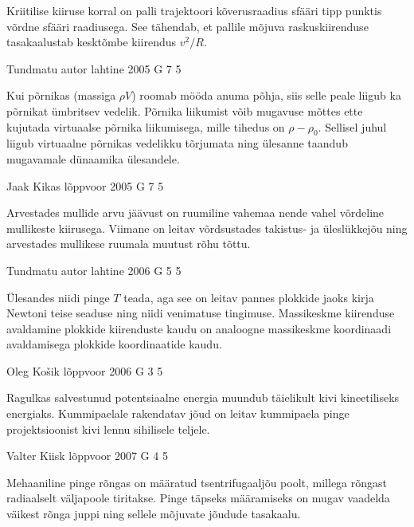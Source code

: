 \documentclass[11pt]{article}
\begin{document}
{{\ifHint
Kriitilise kiiruse korral on palli trajektoori kõverusraadius sfääri tipp punktis võrdne sfääri raadiusega. See tähendab, et pallile mõjuva raskuskiirenduse tasakaalustab kesktõmbe kiirendus $v^2/R$.
\fi
}

{Tundmatu autor} %
{lahtine} %
{2005} %
{G 7} %
{5} %
{

\ifHint
Kui põrnikas (massiga $\rho V$) roomab mööda anuma põhja, siis selle peale liigub ka põrnikat ümbritsev vedelik. Põrnika liikumist võib mugavuse mõttes ette kujutada virtuaalse põrnika liikumisega, mille tihedus on $\rho - \rho_0$. Sellisel juhul liigub virtuaalne põrnikas vedelikku tõrjumata ning ülesanne taandub mugavamale dünaamika ülesandele.
\fi
}

{Jaak Kikas} %
{lõppvoor} %
{2005} %
{G 7} %
{5} %
{

\ifHint
Arvestades mullide arvu jäävust on ruumiline vahemaa nende vahel võrdeline mullikeste kiirusega. Viimane on leitav võrdsustades takistus- ja üleslükkejõu ning arvestades mullikese ruumala muutust rõhu tõttu.
\fi
}

{Tundmatu autor} %
{lahtine} %
{2006} %
{G 5} %
{5} %
{

\ifHint
Ülesandes niidi pinge $T$ teada, aga see on leitav pannes plokkide jaoks kirja Newtoni teise seaduse ning niidi venimatuse tingimuse. Massikeskme kiirenduse avaldamine plokkide kiirenduste kaudu on analoogne massikeskme koordinaadi avaldamisega plokkide koordinaatide kaudu.
\fi
}

{Oleg Košik} %
{lõppvoor} %
{2006} %
{G 3} %
{5} %
{

\ifHint
Ragulkas salvestunud potentsiaalne energia muundub täielikult kivi kineetiliseks energiaks. Kummipaelale rakendatav jõud on leitav kummipaela pinge projektsioonist kivi lennu sihilisele teljele.
\fi
}

{Valter Kiisk} %
{lõppvoor} %
{2007} %
{G 4} %
{5} %
{

\ifHint
Mehaaniline pinge rõngas on määratud tsentrifugaaljõu poolt, millega rõngast radiaalselt väljapoole tiritakse. Pinge täpseks määramiseks on mugav vaadelda väikest rõnga juppi ning sellele mõjuvate jõudude tasakaalu.
\fi
}

}
\end{document}
